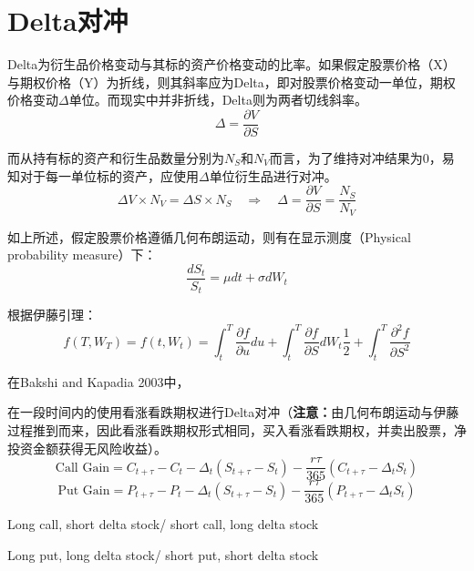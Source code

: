\documentclass[11pt]{article}
\begin{document}
\section{Delta对冲}

Delta为衍生品价格变动与其标的资产价格变动的比率。如果假定股票价格（X）与期权价格（Y）为折线，则其斜率应为Delta，即对股票价格变动一单位，期权价格变动$\Delta$单位。而现实中并非折线，Delta则为两者切线斜率。
\begin{equation*}
    \Delta = \frac{\partial V}{\partial S}
\end{equation*}

而从持有标的资产和衍生品数量分别为$N_S$和$N_V$而言，为了维持对冲结果为0，易知对于每一单位标的资产，应使用$\Delta$单位衍生品进行对冲。
\begin{equation*}
    \Delta V \times N_V = \Delta S \times N_S \quad \Rightarrow \quad
    \Delta = \frac{\partial V}{\partial S} = \frac{N_S}{N_V}
\end{equation*}

如上所述，假定股票价格遵循几何布朗运动，则有在显示测度（Physical probability measure）下：
\begin{equation*}
    \frac{dS_t}{S_t} = \mu dt + \sigma dW_t
\end{equation*}

根据伊藤引理：
\begin{equation*}
    f(T,W_T) =f(t,W_t) = \int^T_t \frac{\partial f}{\partial u}du + \int^T_t \frac{\partial f}{\partial S} dW_t \frac{1}{2} + \int^T_t\frac{\partial ^2 f}{\partial S^2} 
\end{equation*}



在Bakshi and Kapadia 2003中，

在一段时间内的使用看涨看跌期权进行Delta对冲（\textbf{注意：}由几何布朗运动与伊藤过程推到而来，因此看涨看跌期权形式相同，买入看涨看跌期权，并卖出股票，净投资金额获得无风险收益）。
\begin{equation*}
    \text{Call Gain} = C_{t+\tau} - C_t - \Delta_t ( S_{t+\tau}-S_t) - \frac{r\tau}{365}(C_{t+\tau} - \Delta_t S_t)
\end{equation*}
\begin{equation*}
    \text{Put Gain} = P_{t+\tau} - P_t - \Delta_t ( S_{t+\tau}-S_t) - \frac{r\tau}{365}(P_{t+\tau} - \Delta_t S_t)
\end{equation*}

Long call, short delta stock/ short call, long delta stock

Long put, long delta stock/ short put, short delta stock
\end{document}
